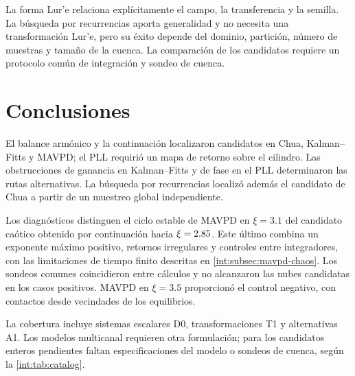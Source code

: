 La forma Lur'e relaciona explícitamente el campo, la transferencia y la semilla. La búsqueda por recurrencias aporta generalidad y no necesita una
transformación Lur'e, pero
su éxito depende del dominio, partición, número de muestras y tamaño de la
cuenca. La comparación de los candidatos requiere un protocolo común de integración
y sondeo de cuenca.


\section{Conclusiones}

El balance armónico y la continuación localizaron candidatos en Chua,
Kalman--Fitts y MAVPD; el PLL requirió un mapa de retorno sobre el cilindro.
Las obstrucciones de ganancia en Kalman--Fitts y de fase en el PLL determinaron
las rutas alternativas. La búsqueda por recurrencias localizó además el
candidato de Chua a partir de un muestreo global independiente.

Los diagnósticos distinguen el ciclo estable de MAVPD en \(\xi=3.1\) del
candidato caótico obtenido por continuación hacia
\(\xi=2.85\). Este último combina un exponente máximo positivo,
retornos irregulares y controles entre integradores, con las limitaciones
de tiempo finito descritas en \cref{int:subsec:mavpd-chaos}.
\ifHAFOBasinMaterial
Los sondeos comunes coincidieron entre cálculos y no alcanzaron las nubes
candidatas en los casos positivos. MAVPD en \(\xi=3.5\) proporcionó el
control negativo, con contactos desde vecindades de los equilibrios.
\fi

La cobertura incluye sistemas escalares D0, transformaciones T1 y
alternativas A1. Los modelos multicanal requieren otra formulación; para los
candidatos enteros pendientes faltan especificaciones del modelo o sondeos
de cuenca, según la \cref{int:tab:catalog}.

